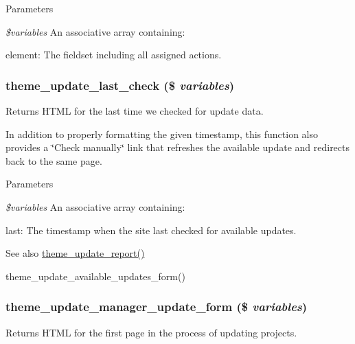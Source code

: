 \begin{DoxyParams}{Parameters}
\item[{\em \$variables}]An associative array containing:
\begin{DoxyItemize}
\item element: The fieldset including all assigned actions. 
\end{DoxyItemize}\end{DoxyParams}
\hypertarget{group__themeable_ga18d1e2e6354e6240afb36496fac2239a}{
\subsubsection[{theme\_\-update\_\-last\_\-check}]{\setlength{\rightskip}{0pt plus 5cm}theme\_\-update\_\-last\_\-check (\$ {\em variables})}}
\label{group__themeable_ga18d1e2e6354e6240afb36496fac2239a}
Returns HTML for the last time we checked for update data.

In addition to properly formatting the given timestamp, this function also provides a \char`\"{}Check manually\char`\"{} link that refreshes the available update and redirects back to the same page.


\begin{DoxyParams}{Parameters}
\item[{\em \$variables}]An associative array containing:
\begin{DoxyItemize}
\item last: The timestamp when the site last checked for available updates.
\end{DoxyItemize}\end{DoxyParams}
\begin{DoxySeeAlso}{See also}
\hyperlink{group__themeable_gab9223d8dc740de3fd1b9fd98c819e438}{theme\_\-update\_\-report()} 

theme\_\-update\_\-available\_\-updates\_\-form() 
\end{DoxySeeAlso}
\hypertarget{group__themeable_gabb2fc045b955c164831ddb609f8720c7}{
\subsubsection[{theme\_\-update\_\-manager\_\-update\_\-form}]{\setlength{\rightskip}{0pt plus 5cm}theme\_\-update\_\-manager\_\-update\_\-form (\$ {\em variables})}}
\label{group__themeable_gabb2fc045b955c164831ddb609f8720c7}
Returns HTML for the first page in the process of updating projects.


